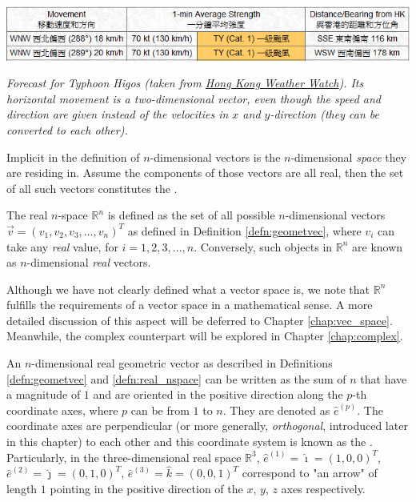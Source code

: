 \begin{table}
    \centering
    \includegraphics[scale = 0.5]{higos.jpg}
    \caption{\textit{Forecast for Typhoon Higos (taken from \href{http://www.hkww.org/weather/tcarchive.html}{Hong Kong Weather Watch}). Its horizontal movement is a two-dimensional vector, even though the speed and direction are given instead of the velocities in $x$ and $y$-direction (they can be converted to each other).}}
\end{table}
Implicit in the definition of $n$-dimensional vectors is the $n$-dimensional \textit{space} they are residing in. Assume the components of those vectors are all real, then the set of all such vectors constitutes the .
\begin{defn}
\label{defn:real_nspace}
The real $n$-space $\mathbb{R}^n$ is defined as the set of all possible $n$-dimensional vectors $\vec{v} = (v_1, v_2, v_3, \ldots, v_n)^T$ as defined in Definition \ref{defn:geometvec}, where $v_i$ can take any \textit{real} value, for $i = 1,2,3,\ldots,n$. Conversely, such objects in $\mathbb{R}^n$ are known as $n$-dimensional \textit{real} vectors.
\end{defn}
Although we have not clearly defined what a vector space is, we note that $\mathbb{R}^n$ fulfills the requirements of a vector space in a mathematical sense. A more detailed discussion of this aspect will be deferred to Chapter \ref{chap:vec_space}. Meanwhile, the complex counterpart will be explored in Chapter \ref{chap:complex}.\par
An $n$-dimensional real geometric vector as described in Definitions \ref{defn:geometvec} and \ref{defn:real_nspace} can be written as the sum of $n$  that have a magnitude of $1$ and are oriented in the positive direction along the $p$-th coordinate axes, where $p$ can be from $1$ to $n$. They are denoted as $\hat{e}^{(p)}$. The coordinate axes are perpendicular (or more generally, \textit{orthogonal}, introduced later in this chapter) to each other and this coordinate system is known as the . Particularly, in the three-dimensional real space $\mathbb{R}^3$, $\hat{e}^{(1)} = \hat{\imath} = (1,0,0)^T$, $\hat{e}^{(2)} = \hat{\jmath} = (0,1,0)^T$, $\hat{e}^{(3)} = \hat{k} = (0,0,1)^T$ correspond to "an arrow" of length $1$ pointing in the positive direction of the $x$, $y$, $z$ axes respectively. 
